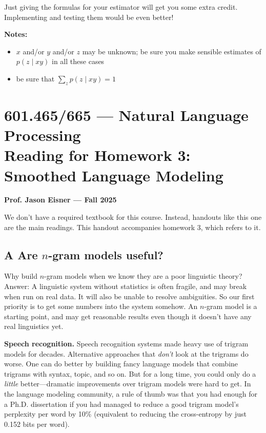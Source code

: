 \documentclass[12pt]{article}
\theoremstyle{plain}
\theoremstyle{definition}
\theoremstyle{remark}
\begin{document}
Just giving the formulas for your estimator will get you some extra credit. Implementing and testing them would be even better!

\textbf{Notes:}
\begin{itemize}
    \item $x$ and/or $y$ and/or $z$ may be unknown; be sure you make sensible estimates of $p(z \mid xy)$ in all these cases
    \item be sure that $\sum_z p(z \mid xy) = 1$
\end{itemize}


\section*{601.465/665 --- Natural Language Processing \\ Reading for Homework 3: Smoothed Language Modeling}

\textbf{Prof. Jason Eisner --- Fall 2025}

We don’t have a required textbook for this course. Instead, handouts like this one are the main readings. This handout accompanies homework 3, which refers to it.

\subsection*{A Are $n$-gram models useful?}

Why build $n$-gram models when we know they are a poor linguistic theory? Answer: A linguistic system without statistics is often fragile, and may break when run on real data. It will also be unable to resolve ambiguities. So our first priority is to get some numbers into the system somehow. An $n$-gram model is a starting point, and may get reasonable results even though it doesn’t have any real linguistics yet.

\textbf{Speech recognition.} Speech recognition systems made heavy use of trigram models for decades. Alternative approaches that \textit{don’t} look at the trigrams do worse. One can do better by building fancy language models that combine trigrams with syntax, topic, and so on. But for a long time, you could only do a \textit{little} better—dramatic improvements over trigram models were hard to get. In the language modeling community, a rule of thumb was that you had enough for a Ph.D. dissertation if you had managed to reduce a good trigram model’s perplexity per word by 10\% (equivalent to reducing the cross-entropy by just 0.152 bits per word).
\end{document}
